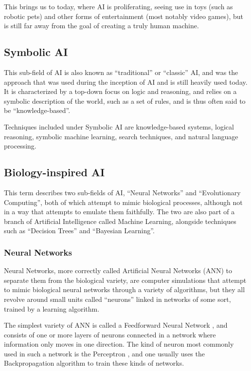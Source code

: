 \documentclass[]{report}
\begin{document}
This brings us to today, where AI is proliferating, seeing use in toys (such as
robotic pets) and other forms of entertainment (most notably video games), but
is still far away from the goal of creating a truly human machine.

\subsection{Symbolic AI}
\label{sec:symbolic-ai}

This sub-field of AI is also known as ``traditional'' or ``classic'' AI, and was
the approach that was used during the inception of AI and is still heavily used
today. It is characterized by a top-down focus on logic and reasoning, and
relies on a symbolic description of the world, such as a set of rules, and is
thus often said to be ``knowledge-based''.

Techniques included under Symbolic AI are knowledge-based systems, logical
reasoning, symbolic machine learning, search techniques, and natural language
processing.

\subsection{Biology-inspired AI}
\label{sec:biology-inspired-ai}

This term describes two sub-fields of AI, ``Neural Networks'' and ``Evolutionary
Computing'', both of which attempt to mimic biological processes, although not
in a way that attempts to emulate them faithfully. The two are also part of a
branch of Artificial Intelligence called Machine Learning, alongside techniques
such as ``Decision Trees'' and ``Bayesian Learning''.

\subsubsection{Neural Networks}
\label{sec:neural-networks}

Neural Networks, more correctly called Artificial Neural Networks (ANN) to
separate them from the biological variety, are computer simulations that attempt
to mimic biological neural networks through a variety of algorithms, but they
all revolve around small units called ``neurons'' linked in networks of some
sort, trained by a learning algorithm.

The simplest variety of ANN is called a Feedforward Neural Network
\citep{wikipediafeedforward}, and consists of one or more layers of neurons
connected in a network where information only moves in one direction. The kind
of neuron most commonly used in such a network is the Perceptron
\citep{minsky1969perceptrons}, and one usually uses the Backpropagation
\citep{wikipediabackpropagation} algorithm to train these kinds of networks.
\end{document}
